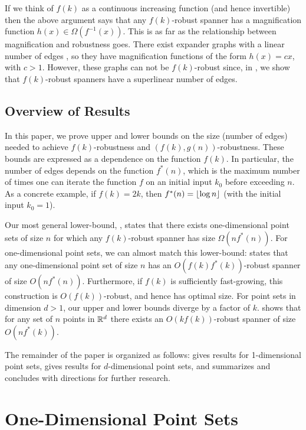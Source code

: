 \documentclass{patmorin}
\begin{document}
If we think of $f(k)$ as a continuous increasing function (and hence
invertible) then the above argument says that any $f(k)$-robust spanner has a magnification function
$h(x) \in \Omega(f^{-1}(x))$.  This is as far as the relationship between
magnification and robustness goes.  There exist expander graphs with a
linear number of edges \cite{hlw06}, so they have magnification functions
of the form $h(x)=cx$, with $c>1$.  However, these graphs can not be
$f(k)$-robust since, in , we show that
$f(k)$-robust spanners have a superlinear number of edges.


\subsection{Overview of Results}

In this paper, we prove upper and lower bounds on the size (number of
edges) needed to achieve $f(k)$-robustness and $(f(k),g(n))$-robustness.
These bounds are expressed as a dependence on the function $f(k)$.
In particular, the number of edges depends on the function $f^*(n)$,
which is the maximum number of times one can iterate the function $f$ on
an initial input $k_0$ before exceeding $n$.  As a concrete example, if
$f(k)=2k$, then  $f^*(n)={\lfloor \log n \rfloor}$ (with the initial input $k_0=1$).

Our most general lower-bound, ,
states that there exists one-dimensional point sets of size $n$
for which any $f(k)$-robust spanner has size $\Omega(nf^*(n))$.
For one-dimensional point sets, we can almost match this lower-bound:
 states that any one-dimensional point set of
size $n$ has an $O(f(k)f^*(k))$-robust spanner of size $O(nf^*(n))$.
Furthermore, if $f(k)$ is sufficiently fast-growing, this construction
is $O(f(k))$-robust, and hence has optimal size.  For point sets in
dimension $d>1$, our upper and lower bounds diverge by a factor of $k$.
 shows that for any set of $n$ points in $\mathbb{R}^d$ there exists
an $O(kf(k))$-robust spanner of size $O(nf^*(k))$.

The remainder of the paper is organized as follows:  
gives results for 1-dimensional point sets,  gives results
for $d$-dimensional point sets, and  summarizes and
concludes with directions for further research.


\section{One-Dimensional Point Sets}
\end{document}
